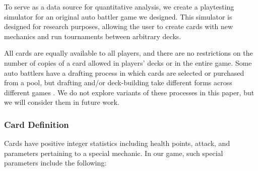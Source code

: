 \documentclass[letterpaper]{article} %
\begin{document}
To serve as a data source for quantitative analysis, we create
a playtesting simulator for an original auto battler game we designed. 
This simulator is designed for research purposes, allowing the user to 
create cards with new mechanics and run tournaments between
arbitrary decks. 

All cards are equally available to all players, and there are no restrictions on the number of copies of a card allowed in players' decks or in the entire game. Some auto battlers have a drafting process in which cards are selected or purchased from a pool, but drafting and/or deck-building take different forms across different games \cite{hearthstone-battlegrounds,storybook-brawl,feh-pawnsOfLoki-video}. We do not explore variants of these processes in this paper, but we will consider them in future work.

\subsubsection{Card Definition} \label{sec:ab-game-def}

Cards have positive integer statistics including health points, 
attack, and parameters pertaining to a special mechanic. In our game, such special parameters
include the following:
\end{document}
